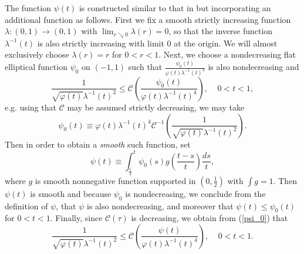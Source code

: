 \documentclass{amsart}
\theoremstyle{plain}
\numberwithin{equation}{section}
\begin{document}
The function $\psi \left( t\right) $ is constructed similar to that in \cite%
{BoBrCoPe} but incorporating an additional function as follows. First we fix
a smooth strictly increasing function $\lambda :\left( 0,1\right)
\rightarrow \left( 0,1\right) $ with $\lim_{r\searrow 0}\lambda \left(
r\right) =0$, so that the inverse function $\lambda ^{-1}\left( t\right) $
is also strictly increasing with limit $0$ at the origin. We will almost
exclusively choose $\lambda \left( r\right) =r$ for $0<r<1$. Next, we choose
a nondecreasing flat elliptical function $\psi _{0}$ on $\left( -1,1\right) $
such that $\frac{\psi _{0}\left( t\right) }{\varphi \left( t\right) \lambda
^{-1}\left( t\right) ^{4}}$ is also nondecreasing and%
\begin{equation}
\frac{1}{\sqrt{\varphi \left( t\right) }\lambda ^{-1}\left( t\right) ^{2}}%
\leq \mathcal{C}\left( \frac{\psi _{0}\left( t\right) }{\varphi \left(
t\right) \lambda ^{-1}\left( t\right) ^{4}}\right) ,\ \ \ \ \ 0<t<1,
\label{psi_0}
\end{equation}%
e.g. using that $\mathcal{C}$ may be assumed strictly decreasing, we may take%
\begin{equation*}
\psi _{0}\left( t\right) \equiv \varphi \left( t\right) \lambda ^{-1}\left(
t\right) ^{4}\mathcal{C}^{-1}\left( \frac{1}{\sqrt{\varphi \left( t\right) }%
\lambda ^{-1}\left( t\right) ^{2}}\right) .
\end{equation*}%
Then in order to obtain a \emph{smooth} such function, set 
\begin{equation*}
\psi \left( t\right) \equiv \int_{\frac{t}{2}}^{t}\psi _{0}\left( s\right)
g\left( \frac{t-s}{t}\right) \frac{ds}{t},
\end{equation*}%
where $g$ is smooth nonnegative function supported in $\left( 0,\frac{1}{2}%
\right) $ with $\int g=1$. Then $\psi \left( t\right) $ is smooth and
because $\psi _{0}$ is nondecreasing, we conclude from the definition of $%
\psi $, that $\psi $ is also nondecreasing, and moreover that $\psi \left(
t\right) \leq \psi _{0}\left( t\right) $ for $0<t<1$. Finally, since $%
\mathcal{C}\left( \tau \right) $ is decreasing, we obtain from (\ref{psi_0})
that%
\begin{equation}
\frac{1}{\sqrt{\varphi \left( t\right) }\lambda ^{-1}\left( t\right) ^{2}}%
\leq \mathcal{C}\left( \frac{\psi \left( t\right) }{\varphi \left( t\right)
\lambda ^{-1}\left( t\right) ^{4}}\right) ,\ \ \ \ \ 0<t<1.  \label{psi_0'}
\end{equation}
\end{document}
